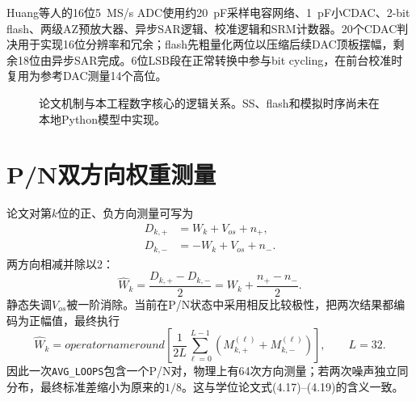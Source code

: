 \documentclass[11pt,a4paper,UTF8,fontset=none,openany]{ctexrep}
\numberwithin{equation}{chapter}
\numberwithin{figure}{chapter}
\numberwithin{table}{chapter}
\newcommand{\rtl}[1]{\path{rtl/#1}}
\begin{document}
Huang等人的16位\SI{5}{MS/s} ADC使用约\SI{20}{pF}采样电容网络、\SI{1}{pF}小CDAC、2-bit flash、两级AZ预放大器、异步SAR逻辑、校准逻辑和SRM计数器\cite{huang2025,huang2024}。20个CDAC判决用于实现16位分辨率和冗余；flash先粗量化两位以压缩后续DAC顶板摆幅，剩余18位由异步SAR完成。6位LSB段在正常转换中参与bit cycling，在前台校准时复用为参考DAC测量14个高位。

\begin{figure}[htbp]
\centering
{}
\caption{论文机制与本工程数字核心的逻辑关系。SS、flash和模拟时序尚未在本地Python模型中实现。}
\end{figure}

\section{P/N双方向权重测量}

论文对第$k$位的正、负方向测量可写为
\begin{align}
D_{k,+} &= W_k+V_{os}+n_{+},\\
D_{k,-} &=-W_k+V_{os}+n_{-}.
\end{align}
两方向相减并除以2：
\begin{equation}
\widehat{W}_k=\frac{D_{k,+}-D_{k,-}}{2}
=W_k+\frac{n_{+}-n_{-}}{2}.
\end{equation}
静态失调$V_{os}$被一阶消除。当前\rtl{sar_calib_ctrl_serial.sv}在P/N状态中采用相反比较极性，把两次结果都编码为正幅值，最终执行
\begin{equation}
\widehat{W}_k=operatorname{round}\left[
\frac{1}{2L}\sum_{\ell=0}^{L-1}
\left(M_{k,+}^{(\ell)}+M_{k,-}^{(\ell)}\right)
\right],\qquad L=32.
\end{equation}
因此一次\texttt{AVG\_LOOPS}包含一个P/N对，物理上有64次方向测量；若两次噪声独立同分布，最终标准差缩小为原来的$1/8$。这与学位论文式(4.17)--(4.19)的含义一致。
\end{document}

